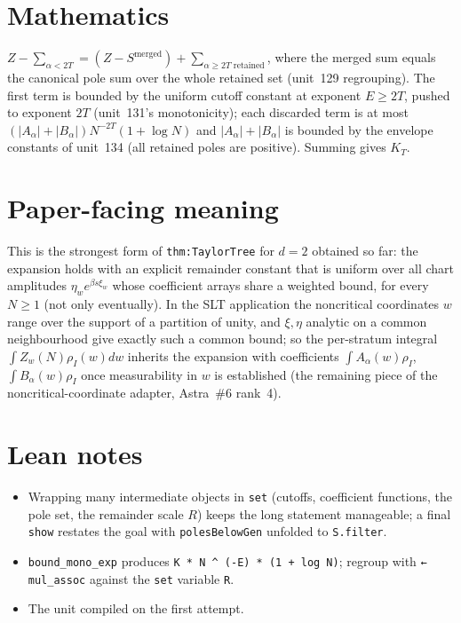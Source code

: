 \documentclass[11pt]{article}
\begin{document}
\section{Mathematics}

$Z-\sum_{\alpha<2T}=(Z-S^{\mathrm{merged}})+\sum_{\alpha\ge2T\text{ retained}}$, where the
merged sum equals the canonical pole sum over the whole retained set (unit~129 regrouping). The
first term is bounded by the uniform cutoff constant at exponent $E\ge2T$, pushed to exponent $2T$
(unit~131's monotonicity); each discarded term is at most $(|A_\alpha|+|B_\alpha|)N^{-2T}(1+\log N)$
and $|A_\alpha|+|B_\alpha|$ is bounded by the envelope constants of unit~134 (all retained poles are
positive). Summing gives $K_T$.

\section{Paper-facing meaning}

This is the strongest form of \texttt{thm:TaylorTree} for $d=2$ obtained so far: the expansion
holds with an explicit remainder constant that is uniform over all chart amplitudes
$\eta_we^{\beta s\xi_w}$ whose coefficient arrays share a weighted bound, for every $N\ge1$ (not
only eventually). In the SLT application the noncritical coordinates $w$ range over the support of
a partition of unity, and $\xi,\eta$ analytic on a common neighbourhood give exactly such a common
bound; so the per-stratum integral $\int Z_w(N)\rho_I(w)dw$ inherits the expansion with
coefficients $\int A_\alpha(w)\rho_I$, $\int B_\alpha(w)\rho_I$ once measurability in $w$ is
established (the remaining piece of the noncritical-coordinate adapter, Astra~\#6 rank~4).

\section{Lean notes}

\begin{itemize}
\item Wrapping many intermediate objects in \texttt{set} (cutoffs, coefficient functions, the
pole set, the remainder scale $R$) keeps the long statement manageable; a final \texttt{show}
restates the goal with \texttt{polesBelowGen} unfolded to \texttt{S.filter}.
\item \texttt{bound\_mono\_exp} produces \texttt{K * N \^{} (-E) * (1 + log N)}; regroup with
\texttt{← mul\_assoc} against the \texttt{set} variable \texttt{R}.
\item The unit compiled on the first attempt.
\end{itemize}
\end{document}
